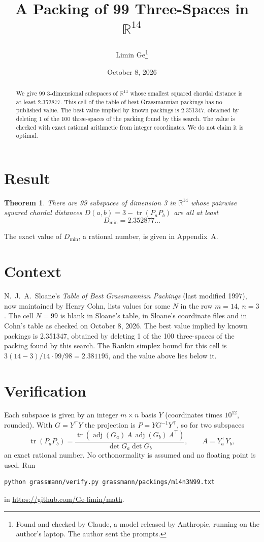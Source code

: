 \documentclass[11pt,a4paper]{article}
\title{A Packing of 99 Three-Spaces in $\mathbb{R}^{14}$}
\author{Limin Ge\thanks{Found and checked by Claude, a model released by Anthropic, running on the author's laptop. The author sent the prompts.}}
\date{October 8, 2026}
\newtheorem*{theorem}{Theorem}
\begin{document}
\maketitle
\begin{abstract}
We give 99 3-dimensional subspaces of $\mathbb{R}^{14}$ whose smallest squared chordal distance is at least 2.352877. This cell of the table of best Grassmannian packings has no published value. The best value implied by known packings is 2.351347, obtained by deleting 1 of the 100 three-spaces of the packing found by this search. The value is checked with exact rational arithmetic from integer coordinates. We do not claim it is optimal.
\end{abstract}

\section{Result}
\begin{theorem}
There are 99 subspaces of dimension 3 in $\mathbb{R}^{14}$ whose pairwise squared chordal distances $D(a,b) = 3 - \operatorname{tr}(P_aP_b)$ are all at least
\[ D_{\min} = 2.352877\ldots \]
\end{theorem}
The exact value of $D_{\min}$, a rational number, is given in Appendix~A.


\section{Context}
N.~J.~A.~Sloane's \emph{Table of Best Grassmannian Packings} (last modified 1997), now maintained by Henry Cohn, lists values for some $N$ in the row $m=14$, $n=3$. The cell $N=99$ is blank in Sloane's table, in Sloane's coordinate files and in Cohn's table as checked on October 8, 2026. The best value implied by known packings is 2.351347, obtained by deleting 1 of the 100 three-spaces of the packing found by this search. The Rankin simplex bound for this cell is $3(14-3)/14\cdot 99/98 = 2.381195$, and the value above lies below it.


\section{Verification}
Each subspace is given by an integer $m\times n$ basis $Y$ (coordinates times $10^{12}$, rounded). With $G=Y^\top Y$ the projection is $P=YG^{-1}Y^\top$, so for two subspaces
\[ \operatorname{tr}(P_aP_b)=\frac{\operatorname{tr}(\operatorname{adj}(G_a)\,A\,\operatorname{adj}(G_b)\,A^\top)}{\det G_a\det G_b},\qquad A=Y_a^\top Y_b, \]
an exact rational number. No orthonormality is assumed and no floating point is used. Run
\begin{verbatim}
python grassmann/verify.py grassmann/packings/m14n3N99.txt
\end{verbatim}
in \url{https://github.com/Ge-limin/math}.
\end{document}
